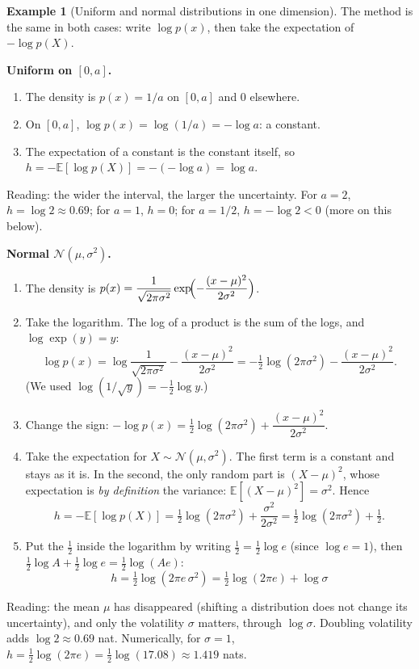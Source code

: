 \documentclass[11pt]{article}
\theoremstyle{plain}
\theoremstyle{definition}
\newtheorem{exemple}[proposition]{Example}
\theoremstyle{remark}
\newcommand{\E}{\mathbb{E}}
\newcommand{\N}{\mathcal{N}}
\begin{document}
\begin{exemple}[Uniform and normal distributions in one dimension]
\label{ex:unif-norm}
The method is the same in both cases: write $\log p(x)$, then take the
expectation of $-\log p(X)$.

\medskip
\noindent\textbf{Uniform on $[0,a]$.}
\begin{enumerate}[label=\arabic*.]
\item The density is $p(x)=1/a$ on $[0,a]$ and $0$ elsewhere.
\item On $[0,a]$, $\log p(x)=\log(1/a)=-\log a$: a constant.
\item The expectation of a constant is the constant itself, so
$h=-\E[\log p(X)]=-(-\log a)=\log a$.
\end{enumerate}
Reading: the wider the interval, the larger the uncertainty. For $a=2$,
$h=\log2\approx0.69$; for $a=1$, $h=0$; for $a=1/2$, $h=-\log2<0$ (more on
this below).

\medskip
\noindent\textbf{Normal $\N(\mu,\sigma^2)$.}
\begin{enumerate}[label=\arabic*.]
\item The density is
$p(x)=\dfrac{1}{\sqrt{2\pi\sigma^2}}\exp\!\Bigl(-\dfrac{(x-\mu)^2}{2\sigma^2}\Bigr)$.
\item Take the logarithm. The log of a product is the sum of the logs, and
$\log\exp(y)=y$:
\[
\log p(x)=\log\frac{1}{\sqrt{2\pi\sigma^2}}-\frac{(x-\mu)^2}{2\sigma^2}
=-\tfrac12\log(2\pi\sigma^2)-\frac{(x-\mu)^2}{2\sigma^2}.
\]
(We used $\log(1/\sqrt{y})=-\tfrac12\log y$.)
\item Change the sign:
$-\log p(x)=\tfrac12\log(2\pi\sigma^2)+\dfrac{(x-\mu)^2}{2\sigma^2}$.
\item Take the expectation for $X\sim\N(\mu,\sigma^2)$. The first term is a
constant and stays as it is. In the second, the only random part is
$(X-\mu)^2$, whose expectation is \emph{by definition} the variance:
$\E[(X-\mu)^2]=\sigma^2$. Hence
\[
h=-\E[\log p(X)]=\tfrac12\log(2\pi\sigma^2)+\frac{\sigma^2}{2\sigma^2}
=\tfrac12\log(2\pi\sigma^2)+\tfrac12 .
\]
\item Put the $\tfrac12$ inside the logarithm by writing
$\tfrac12=\tfrac12\log e$ (since $\log e=1$), then
$\tfrac12\log A+\tfrac12\log e=\tfrac12\log(Ae)$:
\[
\boxed{\,h=\tfrac12\log(2\pi e\,\sigma^2)=\tfrac12\log(2\pi e)+\log\sigma\,}
\]
\end{enumerate}
Reading: the mean $\mu$ has disappeared (shifting a distribution does not
change its uncertainty), and only the volatility $\sigma$ matters, through
$\log\sigma$. Doubling volatility adds $\log2\approx0.69$ nat. Numerically,
for $\sigma=1$, $h=\tfrac12\log(2\pi e)=\tfrac12\log(17.08)\approx1.419$ nats.
\end{exemple}
\end{document}
